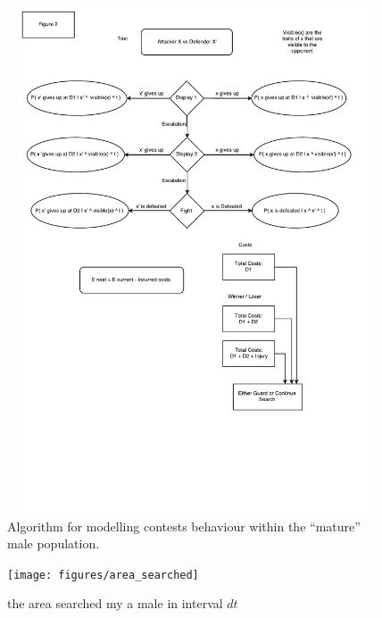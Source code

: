 \documentclass[a4paper,11pt]{article}
\begin{document}
\begin{figure}[h!]
\centering
\includegraphics[width=15cm,height=15cm,keepaspectratio]{figures/contest_algorithm}
\caption{Algorithm for modelling contests behaviour within the ``mature'' male population.}
\label{fig:contests}
\end{figure}
\clearpage

\begin{figure}[h!]
\centering
\texttt{[image: figures/area\_searched]}
\caption{the area searched my a male in interval $dt$}
\label{fig:area searched}
\end{figure}
\clearpage


\end{document}
